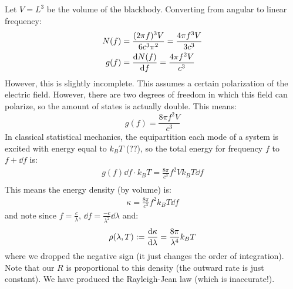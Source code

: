 Let $V = L^3$ be the volume of the blackbody. Converting from angular to linear frequency:
\begin{align*}
    N(f) &= \frac{(2 \pi f)^3 V}{6 c^3 \pi^2} = \frac{4 \pi f^3 V}{3 c^3} \\
    g(f) &= \derivative{N(f)}{f} = \frac{4 \pi f^2 V}{c^3}
\end{align*}
However, this is slightly incomplete. This assumes a certain polarization of the electric field. However, there are two degrees of freedom in which
this field can polarize, so the amount of states is actually double. This means:
\[ g(f) = \frac{8 \pi f^2 V}{c^3} \]
In classical statistical mechanics, the equipartition each mode of a system is excited with energy equal to $k_B T$ (??), so the total energy for frequency $f$ to $f + \dd{f}$ is:
\begin{align*}
    g(f) \dd{f} \cdot k_B T = \frac{8 \pi}{c^3} f^2 V k_B T \dd{f} \\
\end{align*}
This means the energy density (by volume) is:
\begin{align*}
    \kappa = \frac{8\pi}{c^3} f^2 k_B T \dd{f}
\end{align*}
and note since $f = \frac{c}{\lambda}$, $\dd{f} = \frac{-c}{\lambda^2} \dd{\lambda}$ and:
\begin{align*}
    \rho(\lambda, T) := \derivative{\kappa}{\lambda} = \frac{8\pi}{\lambda^4} k_B T
\end{align*}
where we dropped the negative sign (it just changes the order of integration). Note that our $R$ is proportional to this density (the outward rate is just constant).
We have produced the Rayleigh-Jean law (which is inaccurate!).

